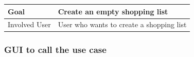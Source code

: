\documentclass[12pt]{article}
\theoremstyle{definition}
\begin{document}
\begin{tabular}{|l|l|}
\hline
Goal & Create an empty shopping list \\ \hline
Involved User &  User who wants to create a shopping list \\ \hline
\end{tabular}

\subsubsection{GUI to call the use case}
\begin{figure}[!h]
           \begin{floatrow}

\end{floatrow}
\end{figure}
\end{document}
